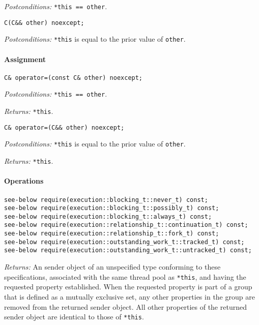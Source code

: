 \documentclass[a4paper,12pt,notitlepage,twoside,openright]{article}
\begin{document}
\emph{Postconditions:} \texttt{*this == other}.

\begin{verbatim}
C(C&& other) noexcept;
\end{verbatim}

\emph{Postconditions:} \texttt{*this} is equal to the prior
value of \texttt{other}.

\hypertarget{assignment-1}{%
\paragraph{Assignment}\label{assignment-1}}

\begin{verbatim}
C& operator=(const C& other) noexcept;
\end{verbatim}

\emph{Postconditions:} \texttt{*this == other}.

\emph{Returns:} \texttt{*this}.

\begin{verbatim}
C& operator=(C&& other) noexcept;
\end{verbatim}

\emph{Postconditions:} \texttt{*this} is equal to the prior
value of \texttt{other}.

\emph{Returns:} \texttt{*this}.

\hypertarget{operations-1}{%
\paragraph{Operations}\label{operations-1}}

\begin{verbatim}
see-below require(execution::blocking_t::never_t) const;
see-below require(execution::blocking_t::possibly_t) const;
see-below require(execution::blocking_t::always_t) const;
see-below require(execution::relationship_t::continuation_t) const;
see-below require(execution::relationship_t::fork_t) const;
see-below require(execution::outstanding_work_t::tracked_t) const;
see-below require(execution::outstanding_work_t::untracked_t) const;
\end{verbatim}

\emph{Returns:} An sender object of an unspecified type conforming to
these specifications, associated with the same thread pool as
\texttt{*this}, and having the requested property
established. When the requested property is part of a group that is
defined as a mutually exclusive set, any other properties in the group
are removed from the returned sender object. All other properties of the
returned sender object are identical to those of
\texttt{*this}.
\end{document}
